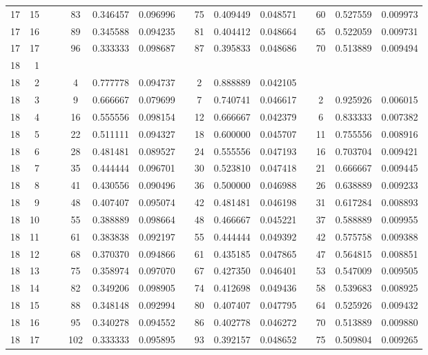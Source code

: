 \begin{appendix}
\begin{longtable}[h]{rrrcccccccccccc}
17	&	15	&&&	83	&	0.346457	&	0.096996	&&	75	&	0.409449	&	0.048571	&&	60	&	0.527559	&	0.009973	\\
17	&	16	&&&	89	&	0.345588	&	0.094235	&&	81	&	0.404412	&	0.048664	&&	65	&	0.522059	&	0.009731	\\
17	&	17	&&&	96	&	0.333333	&	0.098687	&&	87	&	0.395833	&	0.048686	&&	70	&	0.513889	&	0.009494	\\
18	&	1	&&&		&		&		&&		&		&		&&		&		&		\\
18	&	2	&&&	4	&	0.777778	&	0.094737	&&	2	&	0.888889	&	0.042105	&&		&		&		\\
18	&	3	&&&	9	&	0.666667	&	0.079699	&&	7	&	0.740741	&	0.046617	&&	2	&	0.925926	&	0.006015	\\
18	&	4	&&&	16	&	0.555556	&	0.098154	&&	12	&	0.666667	&	0.042379	&&	6	&	0.833333	&	0.007382	\\
18	&	5	&&&	22	&	0.511111	&	0.094327	&&	18	&	0.600000	&	0.045707	&&	11	&	0.755556	&	0.008916	\\
18	&	6	&&&	28	&	0.481481	&	0.089527	&&	24	&	0.555556	&	0.047193	&&	16	&	0.703704	&	0.009421	\\
18	&	7	&&&	35	&	0.444444	&	0.096701	&&	30	&	0.523810	&	0.047418	&&	21	&	0.666667	&	0.009445	\\
18	&	8	&&&	41	&	0.430556	&	0.090496	&&	36	&	0.500000	&	0.046988	&&	26	&	0.638889	&	0.009233	\\
18	&	9	&&&	48	&	0.407407	&	0.095074	&&	42	&	0.481481	&	0.046198	&&	31	&	0.617284	&	0.008893	\\
18	&	10	&&&	55	&	0.388889	&	0.098664	&&	48	&	0.466667	&	0.045221	&&	37	&	0.588889	&	0.009955	\\
18	&	11	&&&	61	&	0.383838	&	0.092197	&&	55	&	0.444444	&	0.049392	&&	42	&	0.575758	&	0.009388	\\
18	&	12	&&&	68	&	0.370370	&	0.094866	&&	61	&	0.435185	&	0.047865	&&	47	&	0.564815	&	0.008851	\\
18	&	13	&&&	75	&	0.358974	&	0.097070	&&	67	&	0.427350	&	0.046401	&&	53	&	0.547009	&	0.009505	\\
18	&	14	&&&	82	&	0.349206	&	0.098905	&&	74	&	0.412698	&	0.049436	&&	58	&	0.539683	&	0.008925	\\
18	&	15	&&&	88	&	0.348148	&	0.092994	&&	80	&	0.407407	&	0.047795	&&	64	&	0.525926	&	0.009432	\\
18	&	16	&&&	95	&	0.340278	&	0.094552	&&	86	&	0.402778	&	0.046272	&&	70	&	0.513889	&	0.009880	\\
18	&	17	&&&	102	&	0.333333	&	0.095895	&&	93	&	0.392157	&	0.048652	&&	75	&	0.509804	&	0.009265	\\

\end{longtable}
\end{appendix}
